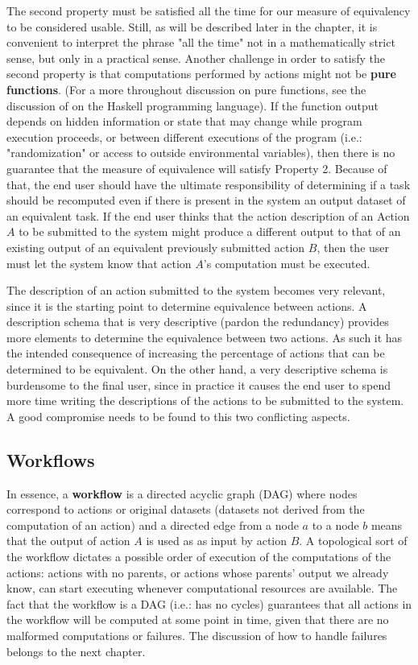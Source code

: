The second property must be satisfied all the time for our measure of equivalency to be considered usable. Still, as will be described later in the chapter, it is convenient to interpret the phrase "all the time" not in a mathematically strict sense, but only in a practical sense.  Another challenge in order to satisfy the second property is that computations performed by actions might not be \textbf{pure functions}. (For a more throughout discussion on pure functions, see the discussion of \cite{jones2003haskell} on the Haskell programming language). If the function output depends on hidden information or state that may change while program execution proceeds, or between different executions of the program (i.e.: "randomization" or access to outside environmental variables), then there is no guarantee that the measure of equivalence will satisfy Property 2.  Because of that, the end user should have the ultimate responsibility of determining if a task should be recomputed even if there is present in the system an output dataset of an equivalent task.  If the end user thinks that the action description of an Action $A$ to be submitted to the system might produce a different output to that of an existing output of an equivalent previously submitted action $B$, then the user must let the system know that action $A$'s computation must be executed.

The description of an action submitted to the system becomes very relevant, since it is the starting point to determine equivalence between actions. A description schema that is very descriptive (pardon the redundancy) provides more elements to determine the equivalence between two actions.  As such it has the intended consequence of increasing the percentage of actions that can be determined to be equivalent. On the other hand, a very descriptive schema is burdensome to the final user, since in practice it causes the end user to spend more time writing the descriptions of the actions to be submitted to the system.  A good compromise needs to be found to this two conflicting aspects.

\subsection{Workflows}
In essence, a \textbf{workflow} is a directed acyclic graph (DAG) where nodes correspond to actions or original datasets (datasets not derived from the computation of an action) and a directed edge from a node $a$ to a node $b$ means that the output of action $A$ is used as as input by action $B$.  A topological sort of the workflow dictates a possible order of execution of the computations of the actions: actions with no parents, or actions whose parents' output we already know, can start executing whenever computational resources are available. The fact that the workflow is a DAG (i.e.: has no cycles) guarantees that all actions in the workflow will be computed at some point in time, given that there are no malformed computations or failures.  The discussion of how to handle failures belongs to the next chapter.

